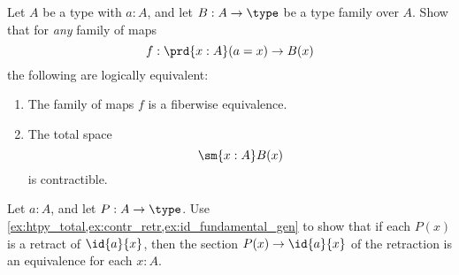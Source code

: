 \begin{exercises}
\item \label{ex:id_fundamental_gen}Let $A$ be a type with $a:A$, and let $B:A\to\type$ be a type family over $A$. Show that for \emph{any} family of maps
\begin{equation*}
f:\prd{x:A} (a=x)\to B(x)
\end{equation*}
the following are logically equivalent:
\begin{enumerate}
\item The family of maps $f$ is a fiberwise equivalence.
\item The total space
\begin{equation*}
\sm{x:A}B(x)
\end{equation*}
is contractible.
\end{enumerate}
\item \label{ex:id_fundamental_retr}Let $a:A$, and let $P:A\to \type$. Use \autoref{ex:htpy_total,ex:contr_retr,ex:id_fundamental_gen} to show that if each $P(x)$ is a retract of $\id{a}{x}$, then the section $P(x)\to\id{a}{x}$ of the retraction is an equivalence for each $x:A$. 
\end{exercises}
